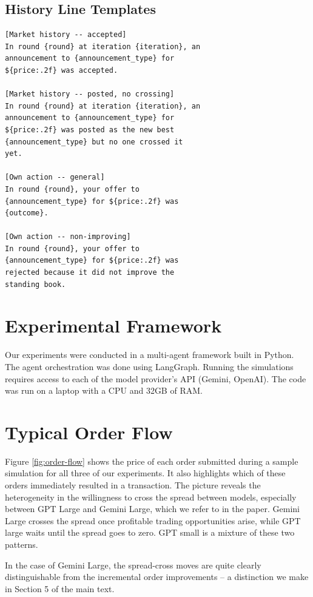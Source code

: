 \documentclass[letterpaper]{article} %
\begin{document}
\subsection{History Line Templates}

\begin{lstlisting}[style=promptcol]
[Market history -- accepted]
In round {round} at iteration {iteration}, an
announcement to {announcement_type} for
${price:.2f} was accepted.

[Market history -- posted, no crossing]
In round {round} at iteration {iteration}, an
announcement to {announcement_type} for
${price:.2f} was posted as the new best
{announcement_type} but no one crossed it
yet.

[Own action -- general]
In round {round}, your offer to
{announcement_type} for ${price:.2f} was
{outcome}.

[Own action -- non-improving]
In round {round}, your offer to
{announcement_type} for ${price:.2f} was
rejected because it did not improve the
standing book.
\end{lstlisting}

\section{Experimental Framework}
Our experiments were conducted in a multi-agent framework built in Python. The agent orchestration was done using LangGraph. Running the simulations requires access to each of the model provider's API (Gemini, OpenAI). The code was run on a laptop with a CPU and 32GB of RAM.
    

\section{Typical Order Flow}
\label{sec:appendix-order-flow}

Figure \ref{fig:order-flow} shows the price of each order submitted during a sample simulation for all three of our experiments. It also highlights which of these orders immediately resulted in a transaction. The picture reveals the heterogeneity in the willingness to cross the spread between models, especially between GPT Large and Gemini Large, which we refer to in the paper. Gemini Large crosses the spread once profitable trading opportunities arise, while GPT large waits until the spread goes to zero. GPT small is a mixture of these two patterns.

In the case of Gemini Large, the spread-cross moves are quite clearly distinguishable from the incremental order improvements -- a distinction we make in Section 5 of the main text.
\end{document}
